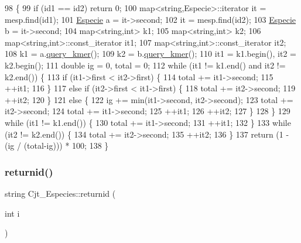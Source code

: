 \begin{DoxyCode}
98                                                            \{
99     \textcolor{keywordflow}{if} (id1 == id2) \textcolor{keywordflow}{return} 0;
100     map<string,Especie>::iterator it = mesp.find(id1);
101     \hyperlink{class_especie}{Especie} a = it->second;
102     it = mesp.find(id2);
103     \hyperlink{class_especie}{Especie} b = it->second;
104     map<string,int> k1;
105     map<string,int> k2;
106     map<string,int>::const\_iterator it1;
107     map<string,int>::const\_iterator it2;
108     k1 = a.\hyperlink{class_especie_ab446000c51668cabe39fb2b72ed5fff0}{query\_kmer}();
109     k2 = b.\hyperlink{class_especie_ab446000c51668cabe39fb2b72ed5fff0}{query\_kmer}();
110     it1 = k1.begin(), it2 = k2.begin();
111     \textcolor{keywordtype}{double} ig = 0, total = 0;
112     \textcolor{keywordflow}{while} (it1 != k1.end() and it2 != k2.end()) \{
113         \textcolor{keywordflow}{if} (it1->first < it2->first) \{
114             total += it1->second;
115             ++it1;
116         \}
117         \textcolor{keywordflow}{else} \textcolor{keywordflow}{if} (it2->first < it1->first) \{
118             total += it2->second;
119             ++it2;
120         \}
121         \textcolor{keywordflow}{else} \{
122             ig += min(it1->second, it2->second);
123             total += it2->second;
124             total += it1->second;
125             ++it1;
126             ++it2;
127         \}
128     \}
129     \textcolor{keywordflow}{while} (it1 != k1.end()) \{
130         total += it1->second;
131         ++it1;
132     \}
133     \textcolor{keywordflow}{while} (it2 != k2.end()) \{
134         total += it2->second;
135         ++it2; 
136     \}
137     \textcolor{keywordflow}{return} (1 - (ig / (total-ig))) * 100;
138 \}
\end{DoxyCode}
\mbox{\label{class_cjt___especies_af33bf6763e518251a77642136064bdbf}} 
\subsubsection{\texorpdfstring{returnid()}{returnid()}}
{\footnotesize\ttfamily string Cjt\+\_\+\+Especies\+::returnid (\begin{DoxyParamCaption}\item[{int}]{i }\end{DoxyParamCaption})}



